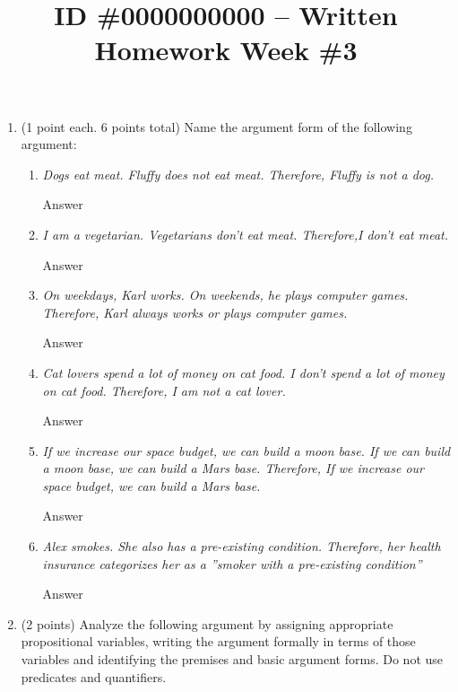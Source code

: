\documentclass{article}
\title{ID \#0000000000 – Written Homework Week \#3}
\begin{document}
\maketitle

\begin{enumerate} 
    \item (1 point each. 6 points total) Name the argument form of the following argument:
    \begin{enumerate}
        \item \textit{Dogs eat meat. Fluffy does not eat meat. Therefore, Fluffy is not a dog.}

        \color{blue}
            Answer
        \color{black}
        
        \item \textit{I am a vegetarian. Vegetarians don’t eat meat. Therefore,I don’t eat meat.}
        
        \color{blue}
            Answer
        \color{black}
        
        \item \textit{On weekdays, Karl works. On weekends, he plays computer games. Therefore, Karl always works or plays computer games.}
        
        \color{blue}
            Answer
        \color{black}
        
        \item \textit{Cat lovers spend a lot of money on cat food. I don’t spend a lot of money on cat food. Therefore, I am not a cat lover.}
        
        \color{blue}
            Answer
        \color{black}
        
        \item \textit{If we increase our space budget, we can build a moon base. If we can build a moon base, we can build a Mars base. Therefore, If we increase our space budget, we can build a Mars base.}
        
        \color{blue}
            Answer
        \color{black}
        
        \item \textit{Alex smokes. She also has a pre-existing condition. Therefore, her health insurance categorizes her as a ”smoker with a pre-existing condition”}
    
        \color{blue}
            Answer
        \color{black}
    \end{enumerate}
    
    \item (2 points) Analyze the following argument by assigning appropriate propositional variables, writing the argument formally in terms of those variables and identifying the premises and basic argument forms. Do not use predicates and quantifiers.


\end{enumerate}
\end{document}
